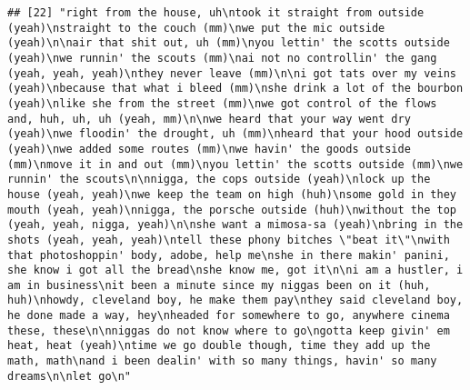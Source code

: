 \documentclass[]{article}
\begin{document}
\begin{verbatim}
## [22] "right from the house, uh\ntook it straight from outside (yeah)\nstraight to the couch (mm)\nwe put the mic outside (yeah)\n\nair that shit out, uh (mm)\nyou lettin' the scotts outside (yeah)\nwe runnin' the scouts (mm)\nai not no controllin' the gang (yeah, yeah, yeah)\nthey never leave (mm)\n\ni got tats over my veins (yeah)\nbecause that what i bleed (mm)\nshe drink a lot of the bourbon (yeah)\nlike she from the street (mm)\nwe got control of the flows and, huh, uh, uh (yeah, mm)\n\nwe heard that your way went dry (yeah)\nwe floodin' the drought, uh (mm)\nheard that your hood outside (yeah)\nwe added some routes (mm)\nwe havin' the goods outside (mm)\nmove it in and out (mm)\nyou lettin' the scotts outside (mm)\nwe runnin' the scouts\n\nnigga, the cops outside (yeah)\nlock up the house (yeah, yeah)\nwe keep the team on high (huh)\nsome gold in they mouth (yeah, yeah)\nnigga, the porsche outside (huh)\nwithout the top (yeah, yeah, nigga, yeah)\n\nshe want a mimosa-sa (yeah)\nbring in the shots (yeah, yeah, yeah)\ntell these phony bitches \"beat it\"\nwith that photoshoppin' body, adobe, help me\nshe in there makin' panini, she know i got all the bread\nshe know me, got it\n\ni am a hustler, i am in business\nit been a minute since my niggas been on it (huh, huh)\nhowdy, cleveland boy, he make them pay\nthey said cleveland boy, he done made a way, hey\nheaded for somewhere to go, anywhere cinema these, these\n\nniggas do not know where to go\ngotta keep givin' em heat, heat (yeah)\ntime we go double though, time they add up the math, math\nand i been dealin' with so many things, havin' so many dreams\n\nlet go\n"                                                                                                                                                                                                                                                                                                                                                                                                                                                                                                                                                                                                                                                                                                                                                                                                                                                                                                                                                                                                                                                                                                                                                                                                                                                                                                                                                                                                                                                                                                                                                                                                                                                                                                                                      
\end{verbatim}
\end{document}
